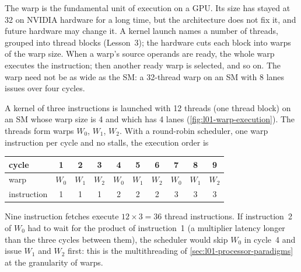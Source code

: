 \documentclass[../main.tex]{subfiles}
\begin{document}
The warp is the fundamental unit of execution on a GPU.  Its size has
stayed at 32 on NVIDIA hardware for a long time, but the architecture
does not fix it, and future hardware may change it.  A
kernel launch names a number of threads, grouped into thread blocks
(Lesson~3); the hardware cuts each block into warps of the warp size.  When a warp's source operands are ready, the
whole warp executes the instruction; then another ready warp is
selected, and so on.  The warp need not be as
wide as the SM: a 32-thread warp on an SM with 8 lanes issues over four
cycles.

\begin{example}
  \label{ex:l01-warps}
  A kernel of three instructions is launched with 12 threads (one
  thread block) on an SM whose warp size is 4 and which has 4 lanes (\cref{fig:l01-warp-execution}).
  The threads form warps $W_0$, $W_1$, $W_2$.  With a round-robin
  scheduler, one warp instruction per cycle and no stalls, the
  execution order is
  \begin{center}
    \begin{tabular}{lccccccccc}
      \toprule
      cycle & 1 & 2 & 3 & 4 & 5 & 6 & 7 & 8 & 9 \\
      \midrule
      warp & $W_0$ & $W_1$ & $W_2$ & $W_0$ & $W_1$ & $W_2$ & $W_0$ & $W_1$ & $W_2$ \\
      instruction & 1 & 1 & 1 & 2 & 2 & 2 & 3 & 3 & 3 \\
      \bottomrule
    \end{tabular}
  \end{center}
  Nine instruction fetches execute $12 \times 3 = 36$ thread
  instructions.  If instruction~2 of $W_0$ had to wait for the product of
  instruction~1 (a multiplier latency longer than the three cycles
  between them), the scheduler would skip $W_0$ in cycle~4 and issue $W_1$ and
  $W_2$ first: this is the multithreading of
  \cref{sec:l01-processor-paradigms} at the granularity of warps.
\end{example}
\end{document}
